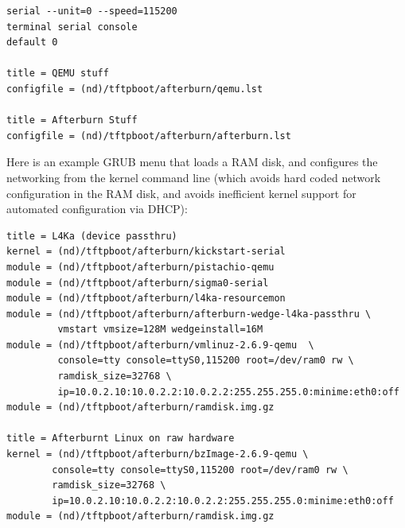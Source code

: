 \documentclass[10pt,a4paper]{article}
\begin{document}
\begin{footnotesize}
\begin{verbatim}
serial --unit=0 --speed=115200
terminal serial console
default 0

title = QEMU stuff
configfile = (nd)/tftpboot/afterburn/qemu.lst

title = Afterburn Stuff
configfile = (nd)/tftpboot/afterburn/afterburn.lst
\end{verbatim}
\end{footnotesize}

Here is an example GRUB menu that loads a RAM disk, and configures the
networking from the kernel command line (which avoids hard coded
network configuration in the RAM disk, and avoids inefficient kernel
support for automated configuration via DHCP):

\begin{footnotesize}
\begin{verbatim}
title = L4Ka (device passthru)
kernel = (nd)/tftpboot/afterburn/kickstart-serial
module = (nd)/tftpboot/afterburn/pistachio-qemu
module = (nd)/tftpboot/afterburn/sigma0-serial
module = (nd)/tftpboot/afterburn/l4ka-resourcemon
module = (nd)/tftpboot/afterburn/afterburn-wedge-l4ka-passthru \
         vmstart vmsize=128M wedgeinstall=16M
module = (nd)/tftpboot/afterburn/vmlinuz-2.6.9-qemu  \
         console=tty console=ttyS0,115200 root=/dev/ram0 rw \
         ramdisk_size=32768 \
         ip=10.0.2.10:10.0.2.2:10.0.2.2:255.255.255.0:minime:eth0:off
module = (nd)/tftpboot/afterburn/ramdisk.img.gz

title = Afterburnt Linux on raw hardware
kernel = (nd)/tftpboot/afterburn/bzImage-2.6.9-qemu \
        console=tty console=ttyS0,115200 root=/dev/ram0 rw \
        ramdisk_size=32768 \
        ip=10.0.2.10:10.0.2.2:10.0.2.2:255.255.255.0:minime:eth0:off
module = (nd)/tftpboot/afterburn/ramdisk.img.gz
\end{verbatim}
\end{footnotesize}
\end{document}
